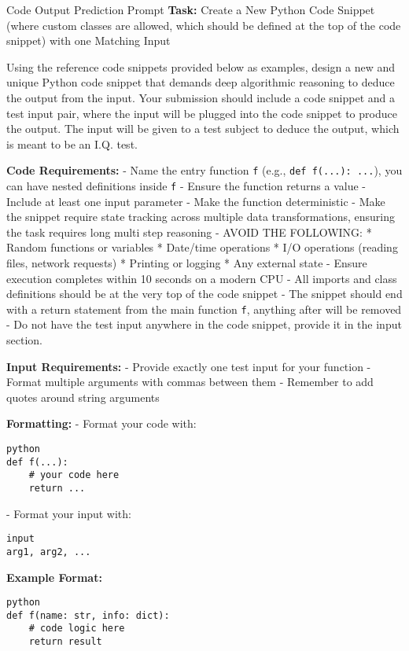 \documentclass[10pt,a4paper]{article}
\begin{document}
\begin{promptbox}{Code Output Prediction Prompt}
\footnotesize
\textbf{Task:} Create a New Python Code Snippet (where custom classes are allowed, which should be defined at the top of the code snippet) with one Matching Input

Using the reference code snippets provided below as examples, design a new and unique Python code snippet that demands deep algorithmic reasoning to deduce the output from the input. Your submission should include a code snippet and a test input pair, where the input will be plugged into the code snippet to produce the output. The input will be given to a test subject to deduce the output, which is meant to be an I.Q. test.

\textbf{Code Requirements:}
- Name the entry function \texttt{f} (e.g., \texttt{def f(...): ...}), you can have nested definitions inside \texttt{f}
- Ensure the function returns a value
- Include at least one input parameter
- Make the function deterministic
- Make the snippet require state tracking across multiple data transformations, ensuring the task requires long multi step reasoning
- AVOID THE FOLLOWING:
  * Random functions or variables
  * Date/time operations
  * I/O operations (reading files, network requests)
  * Printing or logging
  * Any external state
- Ensure execution completes within 10 seconds on a modern CPU
- All imports and class definitions should be at the very top of the code snippet
- The snippet should end with a return statement from the main function \texttt{f}, anything after will be removed
- Do not have the test input anywhere in the code snippet, provide it in the input section.

\textbf{Input Requirements:}
- Provide exactly one test input for your function
- Format multiple arguments with commas between them
- Remember to add quotes around string arguments

\textbf{Formatting:}
- Format your code with:
\begin{verbatim}python
def f(...):
    # your code here
    return ...
\end{verbatim}
- Format your input with:
\begin{verbatim}input
arg1, arg2, ...
\end{verbatim}

\textbf{Example Format:}
\begin{verbatim}python
def f(name: str, info: dict):
    # code logic here
    return result
\end{verbatim}


\end{promptbox}
\end{document}
